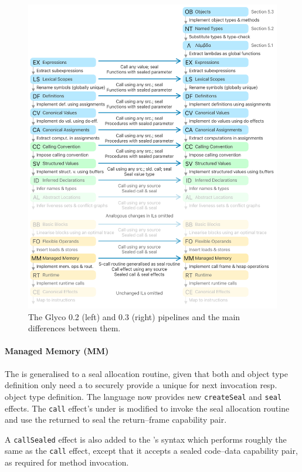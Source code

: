 \documentclass[main.tex]{subfiles}
\begin{document}
\begin{figure}
	\centering
	\includegraphics{Images/Pipeline v0.3.pdf}
	\caption{The Glyco 0.2 (left) and 0.3 (right) pipelines and the main differences between them.}
	\label{fig:pipeline03}
\end{figure}

\paragraph{Managed Memory (MM)} The   is generalised to a seal allocation routine, given that both  and object type definition only need a  to securely provide a unique  for next invocation resp. object type definition. The language now provides new \texttt{createSeal} and \texttt{seal} effects. The \texttt{call} effect's  under  is modified to invoke the seal allocation routine and use the returned  to seal the return–frame capability pair.

A \texttt{callSealed} effect is also added to the 's syntax which performs roughly the same as the \texttt{call} effect, except that it accepts a sealed code–data capability pair, as required for method invocation.
\end{document}
